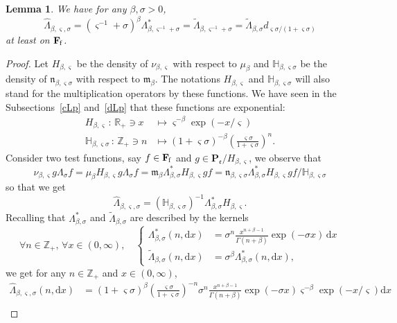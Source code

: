 \documentclass[10pt]{amsart}
\newtheorem{lemm}[theo]{Lemma}\newtheorem{prop}[theo]{Proposition}\newtheorem{coro}[theo]{Corollary}\newtheorem{conj}[theo]{Conjecture}
\theoremstyle{definition}\newtheorem{defi}[theo]{Definition}\newtheorem{rema}[theo]{Remark}\newtheorem{exam}[theo]{Example}\newtheorem{exem}[theo]{Example}\newtheorem{nota}[theo]{Notation}
\newcommand{\RR}{\mathbb{R}}
\newcommand{\ZZ}{\mathbb{Z}}
\newcommand{\fe}{\mathfrak{e}}
\newcommand{\fm}{\mathfrak{m}}
\newcommand{\fn}{\mathfrak{n}}
\newcommand{\iy}{\infty}
\newcommand{\lt}{\left}
\newcommand{\rt}{\right}
\newcommand{\wi}{\widetilde}
\newcommand{\wit}{\widehat}
\newcommand{\st}{\,:\,}
\newcommand{\esP}{\mathbf{P}}
\newcommand{\esF}{\mathbf{F}}
\newcommand{\esPe}{\esP_{\! \fe}}
\newcommand{\esFf}{\esF_{\hskip-.3mm\mathrm{f}}}
\newcommand{\discret}[1]{\mathds{#1}}
\let\oldforall\forall
\renewcommand*{\forall}{\mathrel{\oldforall}}
\newcommand*{\dd}{\mathrm{d}}
\newcommand*{\dx}{\dd x}
\begin{document}
\begin{lemm}\label{differentsadjoints}
We have for any $\beta,\sigma> 0$,
\[
\wit \Lambda_{\beta,\varsigma,\sigma}=\lt(\varsigma^{-1}+\sigma\rt)^\beta \Lambda_{\beta,\varsigma^{-1}+\sigma}^{*}=\wi \Lambda_{\beta,\varsigma^{-1}+\sigma}=\wi \Lambda_{\beta,\sigma}d_{\varsigma\sigma/(1+\varsigma\sigma)}
\]
at least on $\esFf$.
\end{lemm}

\begin{proof}
Let $H_{\beta,\varsigma}$ be the density of $\nu_{\beta,\varsigma}$ with respect to $\mu_{\beta}$ and $\discret{H}_{\beta,\varsigma\sigma}$ be the density of $\fn_{\beta,\varsigma\sigma}$ with respect to $\fm_{\beta}$. The notations $H_{\beta,\varsigma}$ and $\discret{H}_{\beta,\varsigma\sigma}$ will also stand for the multiplication operators by these functions. We have seen in the Subsections~\ref{cLp} and~\ref{dLp} that these functions are exponential:
\begin{align*}
H_{\beta,\varsigma}\st \RR_+\ni x&\mapsto \varsigma^{-\beta}\exp(-x/\varsigma)\\
\discret{H}_{\beta,\varsigma\sigma}\st \ZZ_+\ni n&\mapsto(1+\varsigma\sigma)^{-\beta} \lt(\frac{\varsigma\sigma}{1+\varsigma\sigma}\rt)^n.
\end{align*}
Consider two test functions, say $f\in\esFf$ and $g\in\esPe/H_{\beta,\varsigma}$, we observe that
\[
\nu_{\beta,\varsigma} g\Lambda_{\sigma}f=\mu_{\beta}H_{\beta,\varsigma}g\Lambda_{\sigma}f =\fm_{\beta}\Lambda_{\beta,\sigma}^*H_{\beta,\varsigma}gf =\fn_{\beta,\varsigma\sigma}\Lambda_{\beta,\sigma}^* H_{\beta,\varsigma}gf/\discret{H}_{\beta,\varsigma\sigma}
\]
so that we get
\[
\wit \Lambda_{\beta,\varsigma,\sigma}=(\discret{H}_{\beta,\varsigma\sigma})^{-1}\Lambda_{\beta,\sigma}^*H_{\beta,\varsigma}.
\]
Recalling that $\Lambda_{\beta,\sigma}^*$ and $\wi \Lambda_{\beta,\sigma}$ are described by the kernels
\begin{equation}\label{eq:def_Ladj}
\forall n\in\ZZ_+,\,\forall x\in(0,\iy),\quad\lt\{
\begin{aligned}
\Lambda_{\beta,\sigma}^*(n,\dx)&= \sigma^n\tfrac{x^{n+\beta-1}}{\Gamma(n+\beta)}\exp(-\sigma x)\, \dx\\
\wi \Lambda_{\beta,\sigma}(n,\dx)&= \sigma^\beta\Lambda_{\beta,\sigma}^*(n,\dx),
\end{aligned}\rt.
\end{equation}
we get for any $n\in\ZZ_+$ and $ x\in(0,\iy)$,
\begin{align*}
\wit \Lambda_{\beta,\varsigma,\sigma}(n,\dx)&= (1+\varsigma\sigma)^\beta\lt(\frac{\varsigma\sigma}{1+\varsigma\sigma}\rt)^{-n}\sigma^n\frac{x^{n+\beta-1}}{\Gamma(n+\beta)} \exp(-\sigma x)\varsigma^{-\beta}\exp(-x/\varsigma)\dx\\

\end{align*}
\end{proof}
\end{document}
